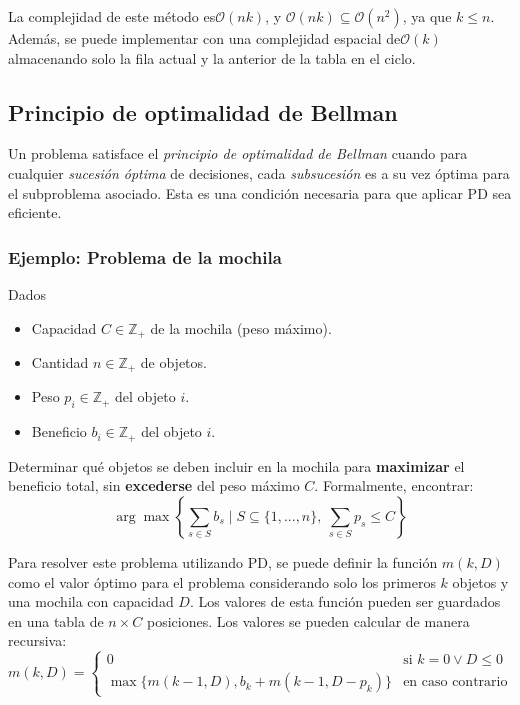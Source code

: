 \documentclass[a4paper]{report}
\newcommand{\BigO}[1]{\ensuremath{\mathcal{O}(#1)}}
\newcommand{\si}{\text{si }}
\newcommand{\ecc}{\text{en caso contrario}}
\newcommand{\Z}{\mathbb{Z}}
\begin{document}
La complejidad de este método es\BigO{nk}, y $\BigO{nk} \subseteq \BigO{n^2}$, ya que $k \leq n$. Además, se puede implementar con una complejidad espacial de\BigO{k} almacenando solo la fila actual y la anterior de la tabla en el ciclo.

\subsection{Principio de optimalidad de Bellman}
\label{optimalidad-bellman}

Un problema satisface el \textit{principio de optimalidad de Bellman} cuando para cualquier \textit{sucesión óptima} de decisiones, cada \textit{subsucesión} es a su vez óptima para el subproblema asociado. Esta es una condición necesaria para que aplicar PD sea eficiente.

\subsubsection{Ejemplo: Problema de la mochila}
\label{problema-mochila}

\begin{problema}
    Dados
    \begin{itemize}
        \item Capacidad $C \in \Z_+$ de la mochila (peso máximo).
        \item Cantidad $n \in \Z_+$ de objetos.
        \item Peso $p_i \in \Z_+$ del objeto $i$.
        \item Beneficio $b_i \in \Z_+$ del objeto $i$.
    \end{itemize}

    Determinar qué objetos se deben incluir en la mochila para \textbf{maximizar} el beneficio total, sin \textbf{excederse} del peso máximo $C$. Formalmente, encontrar:
    $$\arg\max{\left\{\sum_{s \in S} b_s \mid S \subseteq \{1, ..., n\},\ \sum_{s \in S} p_s \leq C \right\}}$$
\end{problema}

Para resolver este problema utilizando PD, se puede definir la función $m(k, D)$ como el valor óptimo para el problema considerando solo los primeros $k$ objetos y una mochila con capacidad $D$. Los valores de esta función pueden ser guardados en una tabla de $n \times C$ posiciones. Los valores se pueden calcular de manera recursiva:
$$
    m(k, D) =
    \begin{cases}
        0                                              & \si k = 0 \lor D \leq 0 \\
        \max{\{m(k - 1, D), b_k + m(k - 1, D - p_k)\}} & \ecc
    \end{cases}
$$
\end{document}
